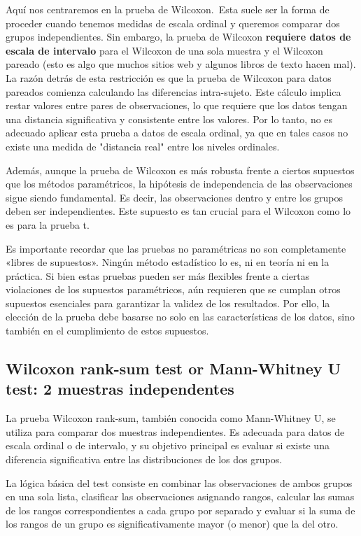 \documentclass{config/apuntes}\usepackage[]{graphicx}\usepackage[]{xcolor}
\begin{document}
Aquí nos centraremos en la prueba de Wilcoxon.\marginpar[\footnotesize !!!!] \    Esta suele ser la forma de proceder cuando tenemos medidas de escala ordinal y queremos comparar dos grupos independientes. Sin embargo, la prueba de Wilcoxon \textbf{requiere datos de escala de intervalo} para el Wilcoxon de una sola muestra y el Wilcoxon pareado (esto es algo que muchos sitios web y algunos libros de texto hacen mal). La razón detrás de esta restricción es que la prueba de Wilcoxon para datos pareados comienza calculando las diferencias intra-sujeto. Este cálculo implica restar valores entre pares de observaciones, lo que requiere que los datos tengan una distancia significativa y consistente entre los valores. Por lo tanto, no es adecuado aplicar esta prueba a datos de escala ordinal, ya que en tales casos no existe una medida de "distancia real" entre los niveles ordinales.

Además, aunque la prueba de Wilcoxon es más robusta frente a ciertos supuestos que los métodos paramétricos, la hipótesis de independencia de las observaciones sigue siendo fundamental. Es decir, las observaciones dentro y entre los grupos deben ser independientes. Este supuesto es tan crucial para el Wilcoxon como lo es para la prueba t.

Es importante recordar que las pruebas no paramétricas no son completamente «libres de supuestos». Ningún método estadístico lo es, ni en teoría ni en la práctica. Si bien estas pruebas pueden ser más flexibles frente a ciertas violaciones de los supuestos paramétricos, aún requieren que se cumplan otros supuestos esenciales para garantizar la validez de los resultados. Por ello, la elección de la prueba debe basarse no solo en las características de los datos, sino también en el cumplimiento de estos supuestos.

\subsection{Wilcoxon rank-sum test or Mann-Whitney U test: 2 muestras independentes}
La prueba Wilcoxon rank-sum, también conocida como Mann-Whitney U, se utiliza para comparar dos muestras independientes. Es adecuada para datos de escala ordinal o de intervalo, y su objetivo principal es evaluar si existe una diferencia significativa entre las distribuciones de los dos grupos.

La lógica básica del test consiste en combinar las observaciones de ambos grupos en una sola lista, clasificar las observaciones asignando rangos, calcular las sumas de los rangos correspondientes a cada grupo por separado y evaluar si la suma de los rangos de un grupo es significativamente mayor (o menor) que la del otro. 
\end{document}
